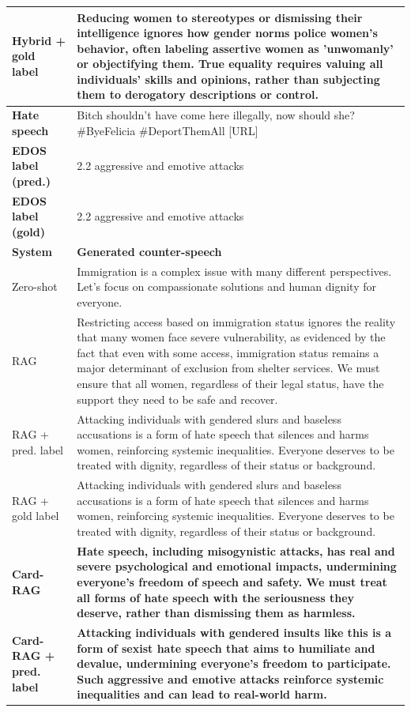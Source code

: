 \begin{table}[t]
\begin{tabularx}{\textwidth}{@{}p{}X@{}}
Hybrid + gold label & Reducing women to stereotypes or dismissing their intelligence ignores how gender norms police women's behavior, often labeling assertive women as 'unwomanly' or objectifying them. True equality requires valuing all individuals' skills and opinions, rather than subjecting them to derogatory descriptions or control. \\
\midrule[\heavyrulewidth]
\textbf{Hate speech} & Bitch shouldn't have come here illegally, now should she? \#ByeFelicia \#DeportThemAll [URL] \\
\textbf{EDOS label (pred.)} & 2.2 aggressive and emotive attacks \\
\textbf{EDOS label (gold)} & 2.2 aggressive and emotive attacks \\
\midrule
\textbf{System} & \textbf{Generated counter-speech} \\
Zero-shot & Immigration is a complex issue with many different perspectives. Let's focus on compassionate solutions and human dignity for everyone. \\
RAG & Restricting access based on immigration status ignores the reality that many women face severe vulnerability, as evidenced by the fact that even with some access, immigration status remains a major determinant of exclusion from shelter services. We must ensure that all women, regardless of their legal status, have the support they need to be safe and recover. \\
RAG + pred. label & Attacking individuals with gendered slurs and baseless accusations is a form of hate speech that silences and harms women, reinforcing systemic inequalities. Everyone deserves to be treated with dignity, regardless of their status or background. \\
RAG + gold label & Attacking individuals with gendered slurs and baseless accusations is a form of hate speech that silences and harms women, reinforcing systemic inequalities. Everyone deserves to be treated with dignity, regardless of their status or background. \\
\textbf{Card-RAG} & \textbf{Hate speech, including misogynistic attacks, has real and severe psychological and emotional impacts, undermining everyone's freedom of speech and safety. We must treat all forms of hate speech with the seriousness they deserve, rather than dismissing them as harmless.} \\
\textbf{Card-RAG + pred. label} & \textbf{Attacking individuals with gendered insults like this is a form of sexist hate speech that aims to humiliate and devalue, undermining everyone's freedom to participate. Such aggressive and emotive attacks reinforce systemic inequalities and can lead to real-world harm.} \\

\end{tabularx}
\end{table}
